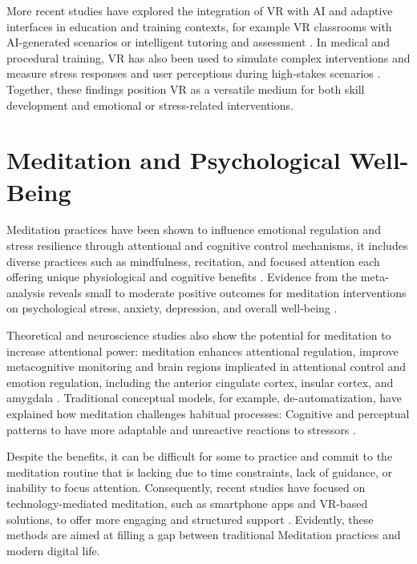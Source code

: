 More recent studies have explored the integration of VR with AI and adaptive interfaces in education and training contexts, for example VR classrooms with AI-generated scenarios or intelligent tutoring and assessment \cite{kortelev2024integration,liu2024smartclassroom,elaine2025adaptivelearning}. In medical and procedural training, VR has also been used to simulate complex interventions and measure stress responses and user perceptions during high-stakes scenarios \cite{rubio2025stress}. Together, these findings position VR as a versatile medium for both skill development and emotional or stress-related interventions.

 \section{Meditation and Psychological Well-Being}
Meditation practices have been shown to influence emotional regulation and stress resilience through attentional and cognitive control mechanisms, it includes diverse practices such as mindfulness, recitation, and focused attention each offering unique physiological and cognitive benefits \cite{sedlmeier2012meta,lutz2008attention,manocha2011mind}. Evidence from the meta-analysis reveals small to moderate positive outcomes for meditation interventions on psychological stress, anxiety, depression, and overall well-being \cite{goyal2014meditation,sedlmeier2012meta}. 

Theoretical and neuroscience studies also show the potential for meditation to increase attentional power: meditation enhances attentional regulation, improve metacognitive monitoring and brain regions implicated in attentional control and emotion regulation, including the anterior cingulate cortex, insular cortex, and amygdala \cite{lutz2008attention}. Traditional conceptual models, for example, de-automatization, have explained how meditation challenges habitual processes:
Cognitive and perceptual patterns to have more adaptable and unreactive reactions to stressors \cite{deikman1966deautomatization,manocha2011mind}. 

Despite the benefits, it can be difficult for some to practice and commit to the meditation routine that is lacking due to time constraints, lack of guidance, or inability to focus attention. Consequently, recent studies have focused on technology-mediated meditation, such as smartphone apps and VR-based solutions, to offer more engaging and structured support \cite{tarrant2018virtual,cebolla2021compassion}. Evidently, these methods are aimed at filling a gap between traditional Meditation practices and modern digital life.


